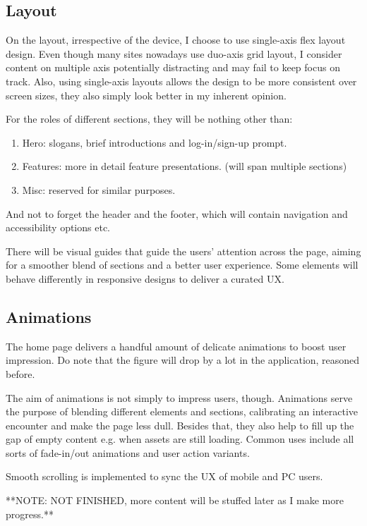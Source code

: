 \documentclass[12pt]{report}
\newcommand{\n}{\par}
\newcommand{\br}{\n\vspace{1 em}\n}
\begin{document}
\subsection{Layout} \label{presentation-layer.design.layout}
On the layout, irrespective of the device, I choose to use single-axis flex layout design.
Even though many sites nowadays use duo-axis grid layout,
I consider content on multiple axis potentially distracting and may fail to keep focus on track.
Also, using single-axis layouts allows the design to be more consistent over screen sizes,
they also simply look better in my inherent opinion.
\br
For the roles of different sections, they will be nothing other than:
\begin{enumerate}
	\item Hero: slogans, brief introductions and log-in/sign-up prompt.
	\item Features: more in detail feature presentations. (will span multiple sections)
	\item Misc: reserved for similar purposes.
\end{enumerate}\n
And not to forget the header and the footer, which will contain navigation and accessibility options etc.\n
There will be visual guides that guide the users' attention across the page,
aiming for a smoother blend of sections and a better user experience.
Some elements will behave differently in responsive designs to deliver a curated UX.


\subsection{Animations} \label{presentation-layer.design.animations}
The home page delivers a handful amount of delicate animations to boost user impression.
Do note that the figure will drop by a lot in the application, reasoned before.\n
The aim of animations is not simply to impress users, though.
Animations serve the purpose of blending different elements and sections,
calibrating an interactive encounter and make the page less dull.
Besides that, they also help to fill up the gap of empty content e.g. when assets are still loading.
Common uses include all sorts of fade-in/out animations and user action variants.\n
Smooth scrolling is implemented to sync the UX of mobile and PC users.
\br
**NOTE: NOT FINISHED, more content will be stuffed later as I make more progress.**





\end{document}
